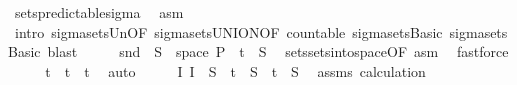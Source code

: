\begin{isabellebody}
\ sets{\isacharunderscore}{\kern0pt}predictable{\isacharunderscore}{\kern0pt}sigma\ \isamarkupfalse%
\ asm\ \isamarkupfalse%
\ {\isacharparenleft}{\kern0pt}intro\ sigma{\isacharunderscore}{\kern0pt}sets{\isacharunderscore}{\kern0pt}Un{\isacharbrackleft}{\kern0pt}OF\ sigma{\isacharunderscore}{\kern0pt}sets{\isacharunderscore}{\kern0pt}UNION{\isacharbrackleft}{\kern0pt}OF\ countable{\isacharbrackright}{\kern0pt}\ sigma{\isacharunderscore}{\kern0pt}sets{\isachardot}{\kern0pt}Basic{\isacharbrackright}{\kern0pt}\ sigma{\isacharunderscore}{\kern0pt}sets{\isachardot}{\kern0pt}Basic{\isacharparenright}{\kern0pt}\ blast{\isacharplus}{\kern0pt}\isanewline
\ \ \isamarkupfalse%
\ \isamarkupfalse%
\ {\isachardoublequoteopen}snd\ {\isacharminus}{\kern0pt}{\isacharbackquote}{\kern0pt}\ S\ {\isasyminter}\ space\ {\isasymSigma}\isactrlsub P\ {\isacharequal}{\kern0pt}\ {\isacharbraceleft}{\kern0pt}t\ {\isasymtimes}\ S{\isachardoublequoteclose}\ \isamarkupfalse%
\ sets{\isachardot}{\kern0pt}sets{\isacharunderscore}{\kern0pt}into{\isacharunderscore}{\kern0pt}space{\isacharbrackleft}{\kern0pt}OF\ asm{\isacharbrackright}{\kern0pt}\ \isamarkupfalse%
\ fastforce\isanewline
\ \ \isamarkupfalse%
\ \isamarkupfalse%
\ {\isachardoublequoteopen}{\isacharbraceleft}{\kern0pt}t\ {\isasymunion}\ {\isacharbraceleft}{\kern0pt}t\ {\isacharequal}{\kern0pt}\ {\isacharbraceleft}{\kern0pt}t\ \isamarkupfalse%
\ auto\isanewline
\ \ \isamarkupfalse%
\ \isamarkupfalse%
\ {\isachardoublequoteopen}{\isacharparenleft}{\kern0pt}{\isasymUnion}I{\isasymin}{\isasymI}{\isachardot}{\kern0pt}\ I\ {\isasymtimes}\ S{\isacharparenright}{\kern0pt}\ {\isasymunion}\ {\isacharbraceleft}{\kern0pt}t\ {\isasymtimes}\ S\ {\isacharequal}{\kern0pt}\ {\isacharbraceleft}{\kern0pt}t\ {\isasymtimes}\ S{\isachardoublequoteclose}\ \isamarkupfalse%
\ assms{\isacharparenleft}{\kern0pt}{}{\isacharcomma}{\kern0pt}{}{\isacharparenright}{\kern0pt}\ calculation{\isacharparenleft}{\kern0pt}{}{\isacharparenright}{\kern0pt}\ \isamarkupfalse%

\end{isabellebody}
